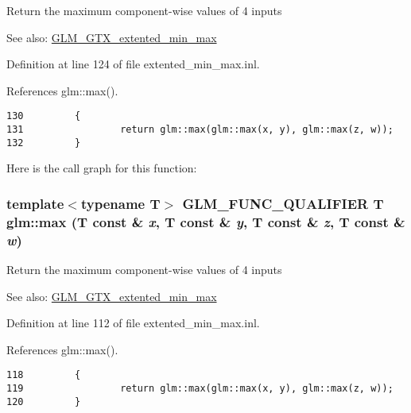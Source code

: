 Return the maximum component-wise values of 4 inputs \begin{Desc}
\item[See also:]\hyperlink{group__gtx__extented__min__max}{GLM\_\-GTX\_\-extented\_\-min\_\-max} \end{Desc}


Definition at line 124 of file extented\_\-min\_\-max.inl.

References glm::max().

\begin{Code}\begin{verbatim}130         {
131                 return glm::max(glm::max(x, y), glm::max(z, w));
132         }
\end{verbatim}
\end{Code}




Here is the call graph for this function:\hypertarget{group__gtx__extented__min__max_g18e8664b11d2c657cb5990fa2fc32001}{
\subsubsection[max]{\setlength{\rightskip}{0pt plus 5cm}template$<$typename T$>$ GLM\_\-FUNC\_\-QUALIFIER T glm::max (T const \& {\em x}, \/  T const \& {\em y}, \/  T const \& {\em z}, \/  T const \& {\em w})}}
\label{group__gtx__extented__min__max_g18e8664b11d2c657cb5990fa2fc32001}


Return the maximum component-wise values of 4 inputs \begin{Desc}
\item[See also:]\hyperlink{group__gtx__extented__min__max}{GLM\_\-GTX\_\-extented\_\-min\_\-max} \end{Desc}


Definition at line 112 of file extented\_\-min\_\-max.inl.

References glm::max().

\begin{Code}\begin{verbatim}118         {
119                 return glm::max(glm::max(x, y), glm::max(z, w));
120         }
\end{verbatim}
\end{Code}




